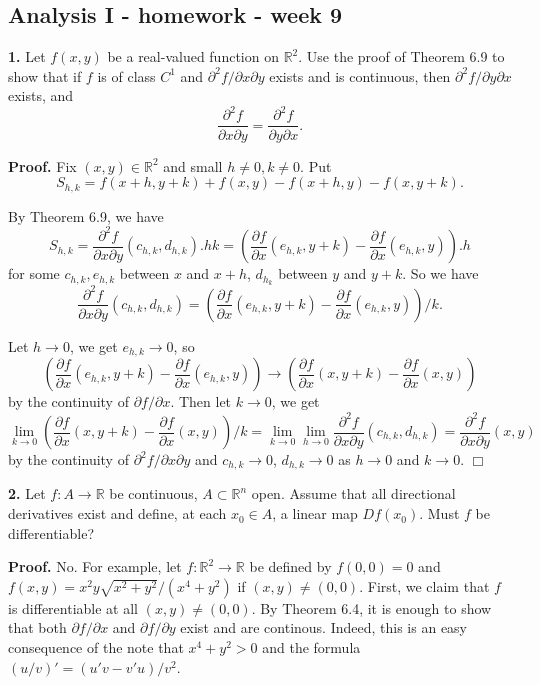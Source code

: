 \documentclass{article}
\begin{document}
    
    
    
    
    

    
    \subsection*{Analysis I - homework - week
9}\label{analysis-i---homework---week-9}

    \textbf{1.} Let $f(x,y)$ be a real-valued function on $\mathbb{R}^2$.
Use the proof of Theorem 6.9 to show that if $f$ is of class $C^1$ and
$\partial^2 f/\partial x \partial y$ exists and is continuous, then
$\partial^2f /\partial y \partial x$ exists, and
\[\frac{\partial^2 f}{\partial x \partial y} = \frac{\partial^2f }{\partial y \partial x}.\]

    \textbf{Proof.} Fix $(x,y) \in \mathbb{R}^2$ and small $h\ne 0,k \ne 0$.
Put \[S_{h,k} = f(x+h,y+k) + f(x,y) - f(x+h,y) - f(x,y+k).\]

By Theorem 6.9, we have
\[S_{h,k} = \frac{\partial^2 f}{\partial x \partial y}(c_{h,k},d_{h,k}).hk=\left( \frac{\partial f}{\partial x}(e_{h,k}, y + k) - \frac{\partial f}{\partial x}(e_{h,k}, y )\right).h \]
for some $c_{h,k},e_{h,k}$ between $x$ and $x+h$, $d_{h_k}$ between $y$
and $y+k$. So we have
\[ \frac{\partial^2 f}{\partial x \partial y}(c_{h,k},d_{h,k})=\left( \frac{\partial f}{\partial x}(e_{h,k}, y + k) - \frac{\partial f}{\partial x}(e_{h,k}, y )\right)/k. \]

Let $h \to 0$, we get $e_{h,k} \to 0$, so
\[\left(\frac{\partial f}{\partial x}(e_{h,k}, y + k) - \frac{\partial f}{\partial x}(e_{h,k}, y) \right)\to \left(\frac{\partial f}{\partial x}(x, y + k) - \frac{\partial f}{\partial x}(x, y)\right)\]
by the continuity of $\partial f/ \partial x$. Then let $k \to 0$, we
get
\[\lim_{k\to 0} \left(\frac{\partial f}{\partial x}(x, y + k) - \frac{\partial f}{\partial x}(x, y)\right)/ k  = \lim_{k\to 0}\lim_{h\to 0} \frac{\partial^2 f}{\partial x \partial y}(c_{h,k},d_{h,k}) =  \frac{\partial^2 f}{\partial x \partial y}(x,y)\]
by the continuity of $\partial^2 f/\partial x \partial y$ and
$c_{h,k}\to 0$, $d_{h,k}\to 0$ as $h \to 0$ and $k\to 0$. $\Box$

    \textbf{2.} Let $f:A\to \mathbb{R}$ be continuous,
$A\subset \mathbb{R}^n$ open. Assume that all directional derivatives
exist and define, at each $x_0\in A$, a linear map $Df(x_0)$. Must $f$
be differentiable?

    \textbf{Proof.} No. For example, let $f : \mathbb{R}^2 \to \mathbb{R}$
be defined by $f(0,0) = 0$ and $f(x,y) = x^2y\sqrt{x^2+y^2}/(x^4+y^2)$
if $(x,y)\ne (0,0)$. First, we claim that $f$ is differentiable at all
$(x,y)\ne (0,0)$. By Theorem 6.4, it is enough to show that both
$\partial f / \partial x$ and $\partial f/ \partial y$ exist and are
continous. Indeed, this is an easy consequence of the note that
$x^4 + y^2 > 0$ and the formula $(u/v)' = (u'v-v'u)/v^2$.
\end{document}
